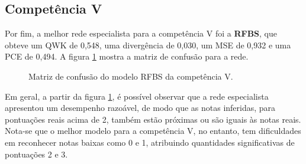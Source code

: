 \subsection{Competência V}
\label{subsec:eval-c5}

Por fim, a melhor rede especialista para a competência V foi a \textbf{RFBS}, que obteve um QWK de 0,548, uma divergência de 0,030, um MSE de 0,932 e uma PCE de 0,494. A figura \ref{fig:eval-c5-confusion-matrix} mostra a matriz de confusão para a rede.

\begin{figure}[H]
    \centering
    \resizebox{0.5\textwidth}{!}{}
    \caption{Matriz de confusão do modelo RFBS da competência V.}
    \label{fig:eval-c5-confusion-matrix}
\end{figure}

Em geral, a partir da figura \ref{fig:eval-c5-confusion-matrix}, é possível observar que a rede especialista apresentou um desempenho razoável, de modo que as notas inferidas, para pontuações reais acima de 2, também estão próximas ou são iguais às notas reais. Nota-se que o melhor modelo para a competência V, no entanto, tem dificuldades em reconhecer notas baixas como 0 e 1, atribuindo quantidades significativas de pontuações 2 e 3.
